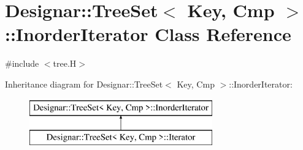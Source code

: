 \hypertarget{class_designar_1_1_tree_set_1_1_inorder_iterator}{}\section{Designar\+:\+:Tree\+Set$<$ Key, Cmp $>$\+:\+:Inorder\+Iterator Class Reference}
\label{class_designar_1_1_tree_set_1_1_inorder_iterator}


{\ttfamily \#include $<$tree.\+H$>$}

Inheritance diagram for Designar\+:\+:Tree\+Set$<$ Key, Cmp $>$\+:\+:Inorder\+Iterator\+:\begin{figure}[H]
\begin{center}
\leavevmode
\includegraphics[height=2.000000cm]{class_designar_1_1_tree_set_1_1_inorder_iterator}
\end{center}
\end{figure}
